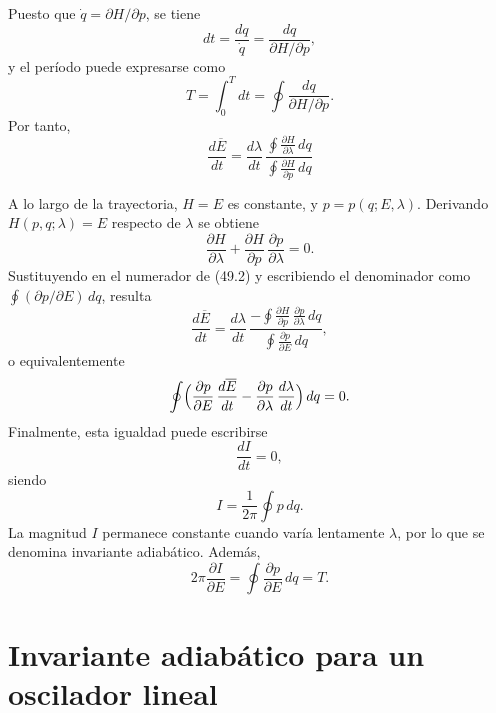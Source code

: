 \documentclass[12pt]{article}
\begin{document}
Puesto que \(\dot q=\partial H/\partial p\), se tiene
\[
dt=\frac{dq}{\dot q}
=\frac{dq}{\partial H/\partial p},
\]
y el período puede expresarse como
\[
T=\int_{0}^{T}dt
=\oint\frac{dq}{\partial H/\partial p}.
\]
Por tanto,
\begin{equation}
\frac{d\overline E}{dt}
=
\frac{d\lambda}{dt}\,
\frac{\displaystyle\oint\frac{\partial H}{\partial\lambda}\,dq}
     {\displaystyle\oint\frac{\partial H}{\partial p}\,dq}
\tag{49.2}
\end{equation}

\noindent A lo largo de la trayectoria, \(H=E\) es constante, y \(p=p(q;E,\lambda)\). Derivando \(H(p,q;\lambda)=E\) respecto de \(\lambda\) se obtiene
\[
\frac{\partial H}{\partial \lambda}
+
\frac{\partial H}{\partial p}\,\frac{\partial p}{\partial \lambda}
=0.
\]
Sustituyendo en el numerador de (49.2) y escribiendo el denominador como \(\oint(\partial p/\partial E)\,dq\), resulta
\[
\frac{d\overline E}{dt}
=
\frac{d\lambda}{dt}\,
\frac{-\displaystyle\oint\frac{\partial H}{\partial p}\,
                  \frac{\partial p}{\partial \lambda}\,dq}
     {\displaystyle\oint\frac{\partial p}{\partial E}\,dq},
\]
o equivalentemente
\[
\oint\Bigl(\frac{\partial p}{\partial E}\,\frac{d\overline E}{dt}
          -\frac{\partial p}{\partial \lambda}\,\frac{d\lambda}{dt}\Bigr)\,dq
=0.
\]
Finalmente, esta igualdad puede escribirse
\begin{equation}
\frac{dI}{dt}=0,
\tag{49.4}
\end{equation}
siendo
\begin{equation}
I=\frac{1}{2\pi}\oint p\,dq.
\tag{49.5}
\end{equation}
La magnitud \(I\) permanece constante cuando varía lentamente \(\lambda\), por lo que se denomina invariante adiabático. Además,
\begin{equation}
2\pi\frac{\partial I}{\partial E}
=\oint\frac{\partial p}{\partial E}\,dq
=T.
\tag{49.6}
\end{equation}

\section*{Invariante adiabático para un oscilador lineal}
\end{document}
